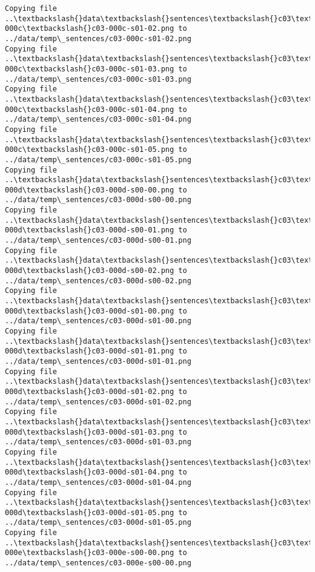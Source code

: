 \documentclass[11pt]{article}
\begin{document}
\begin{Verbatim}[commandchars=\\\{\}]
Copying file ..\textbackslash{}data\textbackslash{}sentences\textbackslash{}c03\textbackslash{}c03-000c\textbackslash{}c03-000c-s01-02.png to
../data/temp\_sentences/c03-000c-s01-02.png
Copying file ..\textbackslash{}data\textbackslash{}sentences\textbackslash{}c03\textbackslash{}c03-000c\textbackslash{}c03-000c-s01-03.png to
../data/temp\_sentences/c03-000c-s01-03.png
Copying file ..\textbackslash{}data\textbackslash{}sentences\textbackslash{}c03\textbackslash{}c03-000c\textbackslash{}c03-000c-s01-04.png to
../data/temp\_sentences/c03-000c-s01-04.png
Copying file ..\textbackslash{}data\textbackslash{}sentences\textbackslash{}c03\textbackslash{}c03-000c\textbackslash{}c03-000c-s01-05.png to
../data/temp\_sentences/c03-000c-s01-05.png
Copying file ..\textbackslash{}data\textbackslash{}sentences\textbackslash{}c03\textbackslash{}c03-000d\textbackslash{}c03-000d-s00-00.png to
../data/temp\_sentences/c03-000d-s00-00.png
Copying file ..\textbackslash{}data\textbackslash{}sentences\textbackslash{}c03\textbackslash{}c03-000d\textbackslash{}c03-000d-s00-01.png to
../data/temp\_sentences/c03-000d-s00-01.png
Copying file ..\textbackslash{}data\textbackslash{}sentences\textbackslash{}c03\textbackslash{}c03-000d\textbackslash{}c03-000d-s00-02.png to
../data/temp\_sentences/c03-000d-s00-02.png
Copying file ..\textbackslash{}data\textbackslash{}sentences\textbackslash{}c03\textbackslash{}c03-000d\textbackslash{}c03-000d-s01-00.png to
../data/temp\_sentences/c03-000d-s01-00.png
Copying file ..\textbackslash{}data\textbackslash{}sentences\textbackslash{}c03\textbackslash{}c03-000d\textbackslash{}c03-000d-s01-01.png to
../data/temp\_sentences/c03-000d-s01-01.png
Copying file ..\textbackslash{}data\textbackslash{}sentences\textbackslash{}c03\textbackslash{}c03-000d\textbackslash{}c03-000d-s01-02.png to
../data/temp\_sentences/c03-000d-s01-02.png
Copying file ..\textbackslash{}data\textbackslash{}sentences\textbackslash{}c03\textbackslash{}c03-000d\textbackslash{}c03-000d-s01-03.png to
../data/temp\_sentences/c03-000d-s01-03.png
Copying file ..\textbackslash{}data\textbackslash{}sentences\textbackslash{}c03\textbackslash{}c03-000d\textbackslash{}c03-000d-s01-04.png to
../data/temp\_sentences/c03-000d-s01-04.png
Copying file ..\textbackslash{}data\textbackslash{}sentences\textbackslash{}c03\textbackslash{}c03-000d\textbackslash{}c03-000d-s01-05.png to
../data/temp\_sentences/c03-000d-s01-05.png
Copying file ..\textbackslash{}data\textbackslash{}sentences\textbackslash{}c03\textbackslash{}c03-000e\textbackslash{}c03-000e-s00-00.png to
../data/temp\_sentences/c03-000e-s00-00.png

\end{Verbatim}
\end{document}
